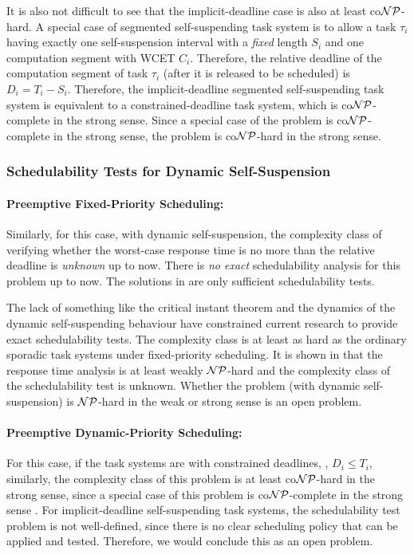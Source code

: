 It is also not difficult to see that the implicit-deadline case is also at least co${\cal NP}$-hard.  A special case of segmented self-suspending task system is to allow a task $\tau_i$ having exactly one self-suspension interval with a \emph{fixed} length $S_i$ and one computation segment with WCET $C_i$. Therefore, the relative deadline of the computation segment of task $\tau_i$ (after it is released to be scheduled) is $D_i = T_i-S_i$. Therefore, the implicit-deadline segmented self-suspending task system is equivalent to a constrained-deadline task system, which is co${\cal NP}$-complete in the strong sense. Since a special case of the problem is co${\cal NP}$-complete in the strong sense, the problem is co${\cal NP}$-hard in the strong sense.


\subsubsection{Schedulability Tests for Dynamic Self-Suspension}
\paragraph{Preemptive Fixed-Priority Scheduling:}   

Similarly, for this case, with dynamic self-suspension, the complexity class of verifying whether the worst-case response time is no more than the relative deadline is \emph{unknown} up to now. There is \emph{no exact} schedulability analysis for this problem up to now. The solutions in \cite{Liu:2000:RS:518501,LiuChen:rtss2014,huangpass:dac2015} are only sufficient schedulability tests. 

The lack of something like the critical instant theorem and the dynamics of the dynamic self-suspending behaviour have constrained current research to provide exact schedulability tests. The complexity class is at least as hard as the ordinary sporadic task systems under fixed-priority scheduling. It is shown in \cite{EisenbrandR08} that the response time analysis is at least weakly ${\cal NP}$-hard and the complexity class of the schedulability test is unknown. Whether the problem (with dynamic self-suspension) is ${\cal NP}$-hard in the weak or strong sense is an open problem.

\paragraph{Preemptive Dynamic-Priority Scheduling:} 
For this case, if the task systems are with constrained deadlines, \ie, $D_i \leq T_i$, similarly, the complexity class of this problem is at least co${\cal NP}$-hard in the strong sense, since a special case of this problem is co${\cal NP}$-complete in the strong sense \cite{DBLP:conf/ecrts/Ekberg015}. For implicit-deadline self-suspending task systems, the schedulability test problem is not well-defined, since there is no clear scheduling policy that can be applied and tested. Therefore, we would conclude this as an open problem.





  